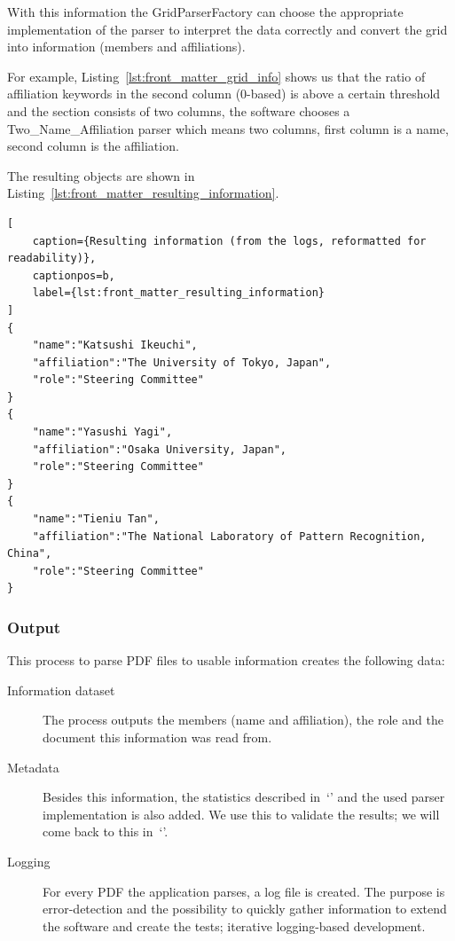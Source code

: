\documentclass{ou-report}
\begin{document}
With this information the GridParserFactory can choose the appropriate 
implementation of the parser to interpret the data correctly and 
convert the grid into information (members and affiliations). 

For example, Listing~\ref{lst:front_matter_grid_info} shows us that 
the ratio of affiliation keywords in the second column (0-based) is 
above a certain threshold and the section consists of two columns, the software 
chooses a Two\_Name\_Affiliation parser which means two columns, first column is a 
name, second column is the affiliation.

The resulting objects are shown in 
Listing~\ref{lst:front_matter_resulting_information}.
\begin{lstlisting}[
    caption={Resulting information (from the logs, reformatted for readability)},
    captionpos=b,
    label={lst:front_matter_resulting_information}
]
{
    "name":"Katsushi Ikeuchi",
    "affiliation":"The University of Tokyo, Japan",
    "role":"Steering Committee"
}
{
    "name":"Yasushi Yagi",
    "affiliation":"Osaka University, Japan",
    "role":"Steering Committee"
}
{
    "name":"Tieniu Tan",
    "affiliation":"The National Laboratory of Pattern Recognition, China",
    "role":"Steering Committee"
}
\end{lstlisting}


\subsubsection{Output}
This process to parse PDF files to usable information creates the 
following data:
\begin{description}
    \item[Information dataset] The process outputs the members (name
        and affiliation), the role and the document this information was read 
        from.
    \item[Metadata] Besides this information, the statistics described in~`' and the used parser 
        implementation is also added. We use this to validate the results; we will come back to this in~`'.
    \item[Logging] For every PDF the application parses, a log file is created.
        The purpose is error-detection and the possibility to quickly gather 
        information to extend the software and create the tests; iterative 
        logging-based development.
\end{description}
\end{document}

